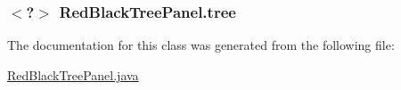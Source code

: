 \subsubsection[{\texorpdfstring{tree}{tree}}]{$<$?$>$ Red\+Black\+Tree\+Panel.\+tree\hspace{0.3cm}{\ttfamily [private]}}\hypertarget{class_red_black_tree_panel_a30733682714e973c0702890d2e43c357}{}\label{class_red_black_tree_panel_a30733682714e973c0702890d2e43c357}


The documentation for this class was generated from the following file\+:\begin{DoxyCompactItemize}
\item 
\hyperlink{_red_black_tree_panel_8java}{Red\+Black\+Tree\+Panel.\+java}\end{DoxyCompactItemize}
